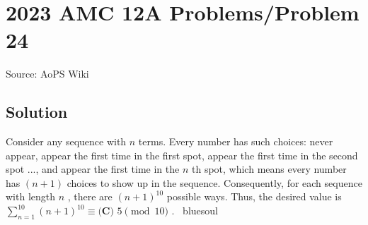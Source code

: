 \documentclass[12pt]{article}
\begin{document}
\section*{{2023 AMC 12A Problems/Problem 24}}
Source: AoPS Wiki

\subsection*{Solution}
Consider any sequence with $n$ terms. Every number has such choices: never appear, appear the first time in the first spot, appear the first time in the second spot ..., and appear the first time in the $n$ th spot, which means every number has $(n+1)$ choices to show up in the sequence. Consequently, for each sequence with length $n$ , there are $(n+1)^{10}$ possible ways. Thus, the desired value is $\sum_{n=1}^{10}(n+1)^{10}\equiv \boxed{\textbf{(C) } 5}\pmod{10}$ . ~bluesoul
\end{document}
